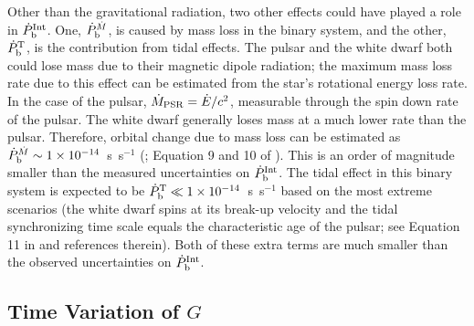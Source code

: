 Other than the gravitational radiation, two other effects could have played a role in
$\dot{P}_{\rm b}^{\rm Int}$. One, $\dot{P}_{\rm b}^{\dot{M}}$, is caused by mass loss in the
binary system, and the other, $\dot{P}_{\rm b}^{\rm T}$, is the contribution
from tidal effects.
The pulsar and the white dwarf both could lose mass due to their magnetic dipole radiation; the maximum
mass loss rate due to this effect can be estimated from the
star's rotational energy loss rate. In the case of the pulsar, $\dot{M}_{\rm
PSR}=\dot{E}/c^2$, measurable through the spin down rate of the pulsar.
The white dwarf generally loses mass at a much lower rate than the pulsar.
Therefore, orbital change due to mass loss can be estimated as $\dot{P}_{\rm
b}^{\dot{M}}\sim 1\times10^{-14}$~s~s$^{-1}$ (\citealt{dt91}; Equation 9 and 10
of \citealt{fwe+12}). This is an order of magnitude smaller than the measured
uncertainties on $\dot{P}_{\rm b}^{\rm Int}$.
The tidal effect in this binary system is expected to be $\dot{P}_{\rm b}^{\rm
T}\ll1\times10^{-14}$~s~s$^{-1}$ based on the most extreme scenarios (the white
dwarf spins at its break-up velocity and the tidal synchronizing time scale equals the
characteristic age of the pulsar; see Equation 11 in \citealt{fwe+12} and
references therein).
Both of these extra terms are much smaller than the observed uncertainties
on $\dot{P}_{\rm b}^{\rm Int}$.


\subsection{Time Variation of $G$}
\label{sec:Gdot}


